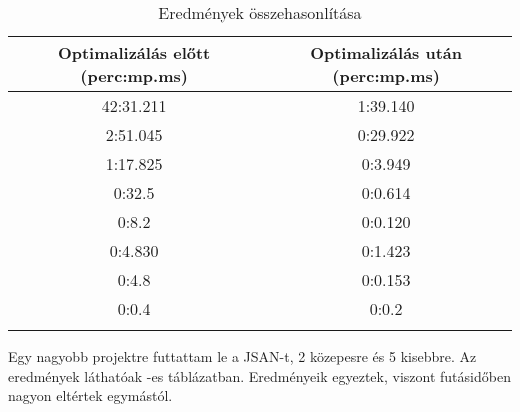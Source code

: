 \begin{table}[h!]
      \begin{center}
      \caption{Eredmények összehasonlítása}\label{tbl:Eredmenyek}
      \begin{tabular}{c c}
      \hline Optimalizálás előtt (perc:mp.ms) & Optimalizálás után (perc:mp.ms)\\
      \hline 42:31.211 & 1:39.140\\
      \hline 2:51.045& 0:29.922\\
      \hline 1:17.825& 0:3.949\\
      \hline 0:32.5& 0:0.614\\
      \hline 0:8.2 & 0:0.120\\
      \hline 0:4.830& 0:1.423\\
      \hline 0:4.8 & 0:0.153\\
      \hline 0:0.4 & 0:0.2\\
      \hline \\
      \end{tabular}
      \end{center}
\end{table}

Egy nagyobb projektre futtattam le a JSAN-t, 2 közepesre és 5 kisebbre. Az eredmények láthatóak -es táblázatban.
Eredményeik egyeztek, viszont futásidőben nagyon eltértek egymástól.
